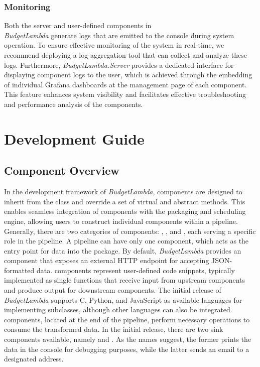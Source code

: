 \documentclass[fleqn,10pt]{SelfArx} %
\newcommand{\CSh}{C\nolinebreak\hspace{-.05em}\raisebox{.6ex}{\scriptsize\bf \#}}
\begin{document}
\subsubsection{Monitoring}
Both the server and user-defined components in \\ \emph{BudgetLambda} generate logs that are emitted to the console during system operation. To ensure effective monitoring of the system in real-time, we recommend deploying a log-aggregation tool that can collect and analyze these logs. Furthermore, \emph{BudgetLambda.Server} provides a dedicated interface for displaying component logs to the user, which is achieved through the embedding of individual Grafana dashboards at the management page of each component. This feature enhances system visibility and facilitates effective troubleshooting and performance analysis of the components.

\section{Development Guide}

\subsection{Component Overview}

In the development framework of \emph{BudgetLambda}, components are designed to inherit from the  class and override a set of virtual and abstract methods. This enables seamless integration of components with the packaging and scheduling engine, allowing users to construct individual components within a pipeline. Generally, there are two categories of components: , , and , each serving a specific role in the pipeline. A pipeline can have only one  component, which acts as the entry point for data into the package. By default, \emph{BudgetLambda} provides an  component that exposes an external HTTP endpoint for accepting JSON-formatted data.  components represent user-defined code snippets, typically implemented as single functions that receive input from upstream components and produce output for downstream components. The initial release of \emph{BudgetLambda} supports \CSh, Python, and JavaScript as available languages for implementing  subclasses, although other languages can also be integrated.  components, located at the end of the pipeline, perform necessary operations to consume the transformed data. In the initial release, there are two sink components available, namely  and . As the names suggest, the former prints the data in the console for debugging purposes, while the latter sends an email to a designated address.
\end{document}
